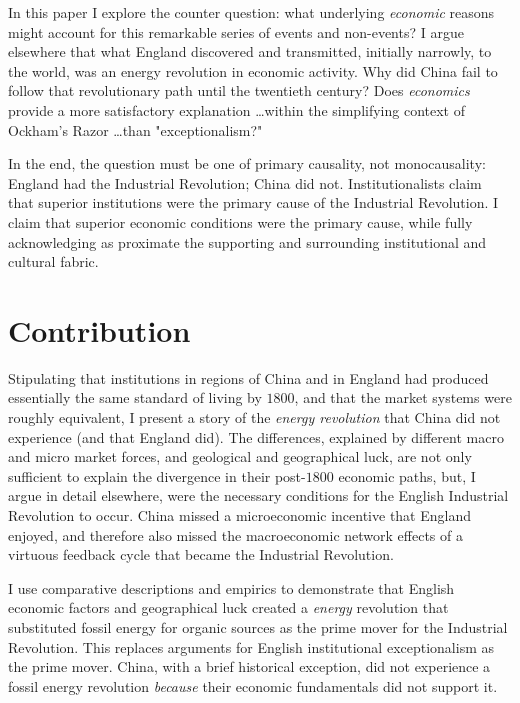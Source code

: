 \documentclass[12pt]{article}
\numberwithin{equation}{section}
\begin{document}
	In this paper I explore the counter question: what underlying \textit{economic} reasons might account for this remarkable series of events and non-events? I argue elsewhere that what England discovered and transmitted, initially  narrowly, to the world, was an energy revolution in economic activity. Why did China fail to follow that revolutionary path until the twentieth century? Does \textit{economics} provide a more satisfactory explanation \ldots within the simplifying context of Ockham's Razor \ldots than "exceptionalism?"
	
	In the end, the question must be one of primary causality, not monocausality: England had the Industrial Revolution; China did not. Institutionalists claim that superior institutions were the primary cause of the Industrial Revolution. I claim that superior economic conditions were the primary cause, while fully acknowledging as proximate the supporting and surrounding institutional and cultural fabric.	
	
	
	\section*{Contribution}
	Stipulating that institutions in regions of China and in England had produced essentially the same standard of living by $1800$, and that the market systems were roughly equivalent, I present a story of the \textit{energy revolution} that China did not experience (and that England did). The differences, explained by different macro and micro market forces, and geological and geographical luck, are not only sufficient to explain the divergence in their post-$1800$ economic paths, but, I argue in detail elsewhere, were the necessary conditions for the English Industrial Revolution to occur. China missed a microeconomic incentive that England enjoyed, and therefore also missed the macroeconomic network effects of a virtuous feedback cycle that became the Industrial Revolution. 
	
	I use comparative descriptions and empirics to demonstrate that English economic factors and geographical luck created a \textit{energy} revolution that substituted fossil energy for organic sources as the prime mover for the Industrial Revolution. This replaces arguments for English institutional exceptionalism as the prime mover. China, with a brief historical exception, did not experience a fossil energy revolution \textit{because} their economic fundamentals did not support it.
	
\end{document}

